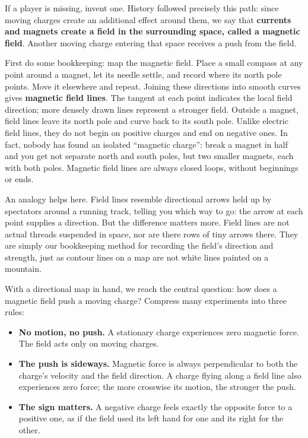 
\begin{mainline}
If a player is missing, invent one. History followed precisely this path: since moving charges create an additional effect around them, we say that \textbf{currents and magnets create a field in the surrounding space, called a magnetic field}. Another moving charge entering that space receives a push from the field.

First do some bookkeeping: map the magnetic field. Place a small compass at any point around a magnet, let its needle settle, and record where its north pole points. Move it elsewhere and repeat. Joining these directions into smooth curves gives \textbf{magnetic field lines}. The tangent at each point indicates the local field direction; more densely drawn lines represent a stronger field. Outside a magnet, field lines leave its north pole and curve back to its south pole. Unlike electric field lines, they do not begin on positive charges and end on negative ones. In fact, nobody has found an isolated ``magnetic charge'': break a magnet in half and you get not separate north and south poles, but two smaller magnets, each with both poles. Magnetic field lines are always closed loops, without beginnings or ends.

An analogy helps here. Field lines resemble directional arrows held up by spectators around a running track, telling you which way to go: the arrow at each point supplies a direction. But the difference matters more. Field lines are not actual threads suspended in space, nor are there rows of tiny arrows there. They are simply our bookkeeping method for recording the field's direction and strength, just as contour lines on a map are not white lines painted on a mountain.

With a directional map in hand, we reach the central question: how does a magnetic field push a moving charge? Compress many experiments into three rules:

\begin{itemize}
  \item \textbf{No motion, no push.} A stationary charge experiences zero magnetic force. The field acts only on moving charges.
  \item \textbf{The push is sideways.} Magnetic force is always perpendicular to both the charge's velocity and the field direction. A charge flying along a field line also experiences zero force; the more crosswise its motion, the stronger the push.
  \item \textbf{The sign matters.} A negative charge feels exactly the opposite force to a positive one, as if the field used its left hand for one and its right for the other.
\end{itemize}


\end{mainline}

